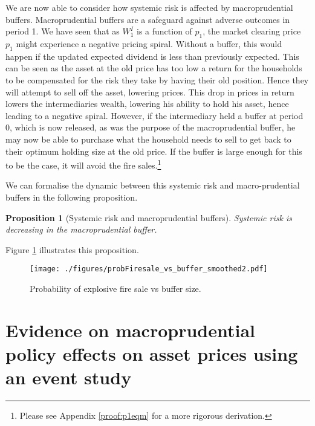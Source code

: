 \documentclass[11pt]{article}
\newtheorem{proposition}{Proposition}
\begin{document}
We are now able to consider how systemic risk is affected by macroprudential buffers. Macroprudential buffers are a safeguard against adverse outcomes in period 1. We have seen that as $W^I_1$ is a function of $p_1$, the market clearing price $p_1$ might experience a negative pricing spiral. Without a buffer, this would happen if the updated expected dividend is less than previously expected. This can be seen as the asset at the old price has too low a return for the households to be compensated for the risk they take by having their old position. Hence they will attempt to sell off the asset, lowering prices. This drop in prices in return lowers the intermediaries wealth, lowering his ability to hold his asset, hence leading to a negative spiral. However, if the intermediary held a buffer at period 0, which is now released, as was the purpose of the macroprudential buffer, he may now be able to purchase what the household needs to sell to get back to their optimum holding size at the old price. If the buffer is large enough for this to be the case, it will avoid the fire sales.\footnote{Please see Appendix \ref{proof:p1eqm} %
for a more rigorous derivation.}

We can formalise the dynamic between this systemic risk and macro-prudential buffers in the following proposition. 

\begin{proposition}[Systemic risk and macroprudential buffers]
\label{p:risk}
Systemic risk is decreasing in the macroprudential buffer.
\end{proposition}

\noindent Figure \ref{f_probFSvsBuffer} illustrates this proposition.


\begin{figure}[h]
\centering
\texttt{[image: ./figures/probFiresale\_vs\_buffer\_smoothed2.pdf]}
\caption{Probability of explosive fire sale vs buffer size.\\ }
\label{f_probFSvsBuffer}
\end{figure}


\section{Evidence on macroprudential policy effects on asset prices using an event study} \label{sec:empiricalAnalysis}
\end{document}
